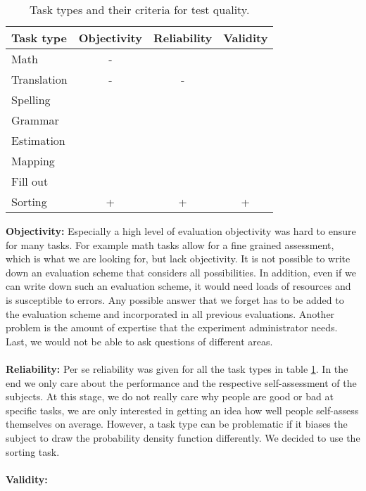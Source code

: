 \documentclass[../main/main.tex]{subfiles}
\begin{document}
	\begin{table}[h]
		\centering

		\begin{tabular}{l|c|c|c}
			\textbf{Task type} & \textbf{Objectivity} & \textbf{Reliability} & \textbf{Validity} \\
			\hline
			Math & - & & \\
			Translation & - & - & \\
			Spelling & & & \\
			Grammar & & & \\
			Estimation & & & \\
			Mapping & & & \\
			Fill out & & & \\
			Sorting & + & + & + \\
		\end{tabular}
		 \captionsetup{justification=centering}
		 \label{tab:task-types}
		\caption{Task types and their criteria for test quality.}
	\end{table}	
	
	\noindent\textbf{Objectivity:} Especially a high level of evaluation objectivity was hard to ensure for many tasks. For example math tasks allow for a fine grained assessment, which is what we are looking for, but lack objectivity. It is not possible to write down an evaluation scheme that considers all possibilities. In addition, even if we can write down such an evaluation scheme, it would need loads of resources and is susceptible to errors. Any possible answer that we forget has to be added to the evaluation scheme and incorporated in all previous evaluations. Another problem is the amount of expertise that the experiment administrator needs. Last, we would not be able to ask questions of different areas.
	\\\\
	\noindent\textbf{Reliability:} Per se reliability was given for all the task types in table \ref{tab:task-types}. In the end we only care about the performance and the respective self-assessment of the subjects. At this stage, we do not really care why people are good or bad at specific tasks, we are only interested in getting an idea how well people self-assess themselves on average. However, a task type can be problematic if it biases the subject to draw the probability density function differently. We decided to use the sorting task. 
	\\\\
	\noindent\textbf{Validity:}
	
\end{document}
